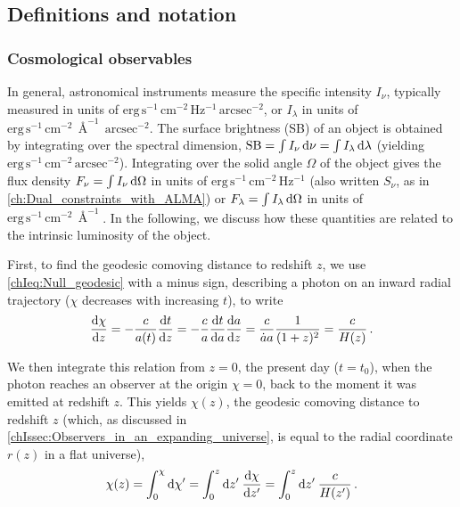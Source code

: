 \subsection{Definitions and notation}
\label{chIssec:Definitions_and_notation}

\subsubsection{Cosmological observables}
\label{chIsssec:Cosmological_observables}

In general, astronomical instruments measure the specific intensity $I_\nu$, typically measured in units of $\mathrm{erg \, s^{-1} \, cm^{-2} \, Hz^{-1} \, arcsec^{-2}}$, or $I_\lambda$ in units of $\mathrm{erg \, s^{-1} \, cm^{-2} \, \Angstrom^{-1} \, arcsec^{-2}}$. The surface brightness (SB) of an object is obtained by integrating over the spectral dimension, $\text{SB} = \int I_\nu \dif \nu = \int I_\lambda \dif \lambda$ (yielding $\mathrm{erg \, s^{-1} \, cm^{-2} \, arcsec^{-2}}$). Integrating over the solid angle $\Omega$ of the object gives the flux density $F_\nu = \int I_\nu \dif \Omega$ in units of $\mathrm{erg \, s^{-1} \, cm^{-2} \, Hz^{-1}}$ (also written $S_\nu$, as in \cref{ch:Dual_constraints_with_ALMA}) or $F_\lambda = \int I_\lambda \dif \Omega$ in units of $\mathrm{erg \, s^{-1} \, cm^{-2} \, \Angstrom^{-1}}$. In the following, we discuss how these quantities are related to the intrinsic luminosity of the object.

First, to find the geodesic comoving distance to redshift $z$, we use \cref{chIeq:Null_geodesic} with a minus sign, describing a photon on an inward radial trajectory ($\chi$ decreases with increasing $t$), to write
\begin{equation}
    \label{chIeq:Null_geodesic_redshift}
    \frac{\dif \chi}{\dif z} = - \frac{c}{a(t)} \frac{\dif t}{\dif z} = - \frac{c}{a} \frac{\dif t}{\dif a} \frac{\dif a}{\dif z} = \frac{c}{\dot{a} a} \frac{1}{(1+z)^2} = \frac{c}{H(z)} \, .
\end{equation}

We then integrate this relation from $z = 0$, the present day ($t = t_0$), when the photon reaches an observer at the origin $\chi = 0$, back to the moment it was emitted at redshift $z$. This yields $\chi (z)$, the geodesic comoving distance to redshift $z$ (which, as discussed in \cref{chIssec:Observers_in_an_expanding_universe}, is equal to the radial coordinate $r (z)$ in a flat universe),
\begin{equation}
    \label{chIeq:Comoving_distance}
    \chi(z) = \int_0^\chi \dif \chi' = \int_0^z \dif z' \: \frac{\dif \chi}{\dif z'} = \int_0^z \dif z' \: \frac{c}{H(z')} \, .
\end{equation}

